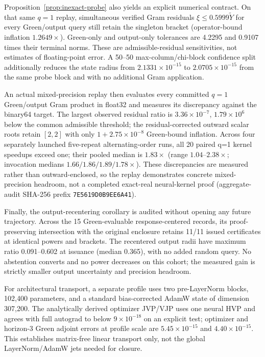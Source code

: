 \documentclass{article}
\begin{document}
Proposition~\ref{prop:inexact-probe} also yields an explicit numerical contract.
On that same $q=1$ replay, simultaneous verified Gram residuals
$\xi\le0.5999\widetilde Y$ for every Green/output query still retain the
singleton bracket (operator-bound inflation $1.2649\times$).  Green-only and
output-only tolerances are 4.2295 and 0.9107 times their terminal norms.  These
are admissible-residual sensitivities, not estimates of floating-point error.
A 50--50 max-column/chi-block confidence split additionally reduces the state
radius from $2.1331\times10^{-15}$ to $2.0705\times10^{-15}$ from the same
probe block and with no additional Gram application.

An actual mixed-precision replay then evaluates every committed $q=1$
Green/output Gram product in float32 and measures its discrepancy against the
binary64 target.  The largest observed residual ratio is
$3.36\times10^{-7}$, $1.79\times10^6$ below the common admissible threshold;
the residual-corrected outward scalar roots retain $[2,2]$ with only
$1+2.75\times10^{-8}$ Green-bound inflation.  Across four separately launched
five-repeat alternating-order runs, all 20 paired q=1 kernel speedups exceed
one; their pooled median is $1.83\times$ (range $1.04$--$2.38\times$;
invocation medians $1.66/1.86/1.89/1.78\times$).  These discrepancies are measured rather than outward-enclosed,
so the replay demonstrates concrete mixed-precision headroom, not a completed
exact-real neural-kernel proof (aggregate-audit SHA-256 prefix
\texttt{7E5619D0B9EE6A41}).

Finally, the output-recentering corollary is audited without opening any future
trajectory.  Across the 15 Green-evaluable response-centered records, its
proof-preserving intersection with the original enclosure retains 11/11 issued
certificates at identical powers and brackets.  The recentered output radii
have maximum ratio 0.091--0.602 at issuance (median 0.365), with no added random query.  No
abstention converts and no power decreases on this cohort; the measured gain is
strictly smaller output uncertainty and precision headroom.

For architectural transport, a separate profile uses two pre-LayerNorm blocks,
102,400 parameters, and a standard bias-corrected AdamW state of dimension
307,200.  The analytically derived optimizer JVP/VJP uses one neural HVP and
agrees with full autograd to below $9\times10^{-18}$ on an explicit test;
optimizer and horizon-3 Green adjoint errors at profile scale are
$5.45\times10^{-15}$ and $4.40\times10^{-15}$.  This establishes matrix-free
linear transport only, not the global LayerNorm/AdamW jets needed for closure.
\end{document}
